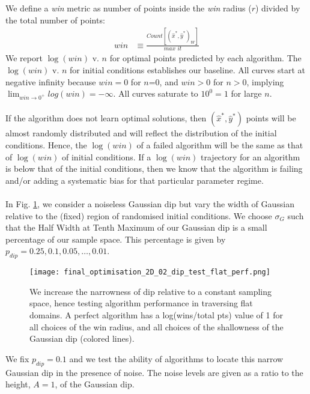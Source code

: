 We define a \textit{win} metric as number of points inside the \textit{win} radius ($r$) divided by the total number of points:
\begin{align}
win &\equiv \frac{Count[(\hat{x}^*, \hat{y}^*)_W]}{\textit{max it}}
\end{align}
We report $\log(win)$ v. $n$ for optimal points predicted by each algorithm. The $\log(win)$ v. $n$ for initial conditions establishes our baseline. All curves start at negative infinity because $win=0$ for $n$=0, and $win > 0 $ for $n>0$, implying $\lim_{win \to 0^+} log(win) = -\infty$. All curves saturate to $10^0 = 1$ for large $n$.
\\
\\
If the algorithm does not learn optimal solutions, then $(\hat{x}^*, \hat{y}^*)$ points will be almost randomly distributed and will reflect the distribution of the initial conditions. Hence, the $\log(win)$ of a failed algorithm will be the same as that of $\log(win)$ of initial conditions. If a $\log(win)$ trajectory for an algorithm is below that of the initial conditions, then we know that the algorithm is failing and/or adding a systematic bias for that particular parameter regime.
\\
\\
In Fig. \ref{fig:final_optimisation_2D_02_dip_test_flat_perf}, we consider a noiseless Gaussian dip but vary the width of Gaussian relative to the (fixed) region of randomised initial conditions. We choose $\sigma_G$ such that the Half Width at Tenth Maximum of our Gaussian dip is a small percentage of our sample space. This percentage is given by $ p_{dip} = 0.25, 0.1, 0.05, \dots, 0.01$.
\begin{figure}[h!]
	\centering
	\caption[Optimisation Routines: Algorithm Search on 2D Flat Surface - Performance Analysis]{We increase the narrowness of dip relative to a constant sampling space, hence testing algorithm performance in traversing flat domains. A perfect algorithm has a log(wins/total pts) value of 1 for all choices of the win radius, and all choices of the shallowness of the Gaussian dip (colored lines).} 
	\texttt{[image: final\_optimisation\_2D\_02\_dip\_test\_flat\_perf.png]} \label{fig:final_optimisation_2D_02_dip_test_flat_perf}
\end{figure}
\FloatBarrier
We fix $p_{dip}=0.1$ and we test the ability of algorithms to locate this narrow Gaussian dip in the presence of noise. The noise levels are given as a ratio to the height, $A=1$, of the Gaussian dip.
